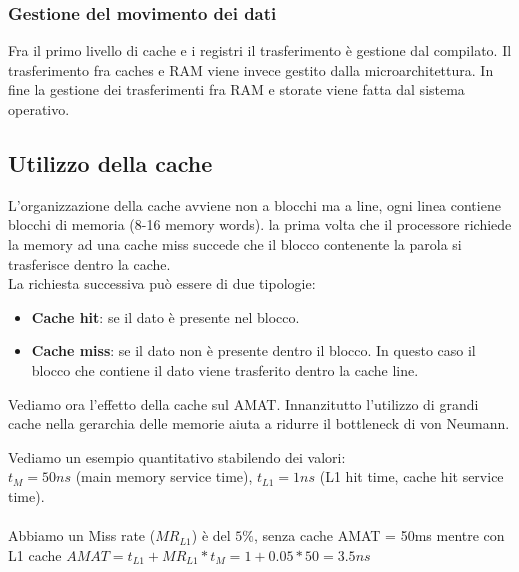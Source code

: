 \subsubsection{Gestione del movimento dei dati}
Fra il primo livello di cache e i registri il trasferimento è gestione dal compilato. Il trasferimento fra caches e RAM viene invece gestito dalla microarchitettura. In fine la gestione dei trasferimenti fra RAM e storate viene fatta dal sistema operativo.

\subsection{Utilizzo della cache}
L'organizzazione della cache avviene non a blocchi ma a line, ogni linea contiene blocchi di memoria (8-16 memory words). la prima volta che il processore richiede la memory ad una cache miss succede che il blocco contenente la parola si trasferisce dentro la cache. \\
La richiesta successiva può essere di due tipologie:
\begin{itemize}
    \item \textbf{Cache hit}: se il dato è presente nel blocco.
    \item \textbf{Cache miss}: se il dato non è presente dentro il blocco. In questo caso il blocco che contiene il dato viene trasferito dentro la cache line.
\end{itemize}

Vediamo ora l'effetto della cache sul AMAT. Innanzitutto l'utilizzo di grandi cache nella gerarchia delle memorie aiuta a ridurre il bottleneck di von Neumann. 
\begin{example}
Vediamo un esempio quantitativo stabilendo dei valori:\\
$t_M = 50ns$ (main memory service time), $t_{L1} = 1ns$ (L1 hit time, cache hit service time). \\\\
Abbiamo un Miss rate ($MR_{L1}$) è del $5\%$, senza cache AMAT = 50ms mentre con L1 cache $AMAT = t_{L1} + MR_{L1} * t_M = 1 + 0.05 * 50 = 3.5ns$
\end{example}